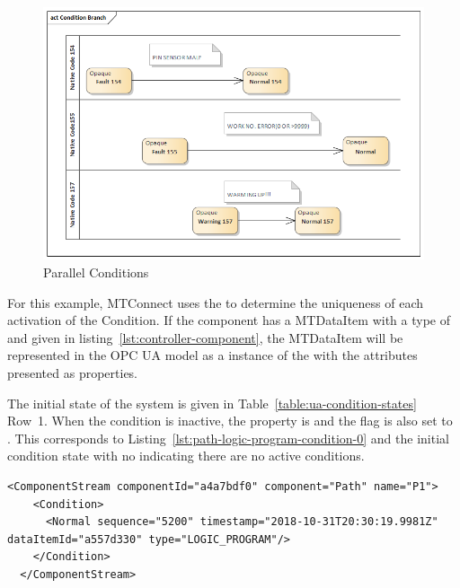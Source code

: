 \begin{figure}[ht]
  \centering
  \includegraphics[width=1.0\textwidth]{diagrams/mtconnect-mapping/condition-branching.png}
  \caption{Parallel Conditions}
  \label{fig:condition-branching}
\end{figure}

For this example, MTConnect uses the  to determine the uniqueness of each activation of the Condition. If the  component has a \gls{MTDataItem} with a \gls{type} of  and given in listing~\ref{lst:controller-component}, the \gls{MTDataItem} will be represented in the OPC UA model as a instance of the  with the attributes presented as properties.

The initial state of the system is given in Table~\ref{table:ua-condition-states} Row~1. When the condition is inactive, the  property is  and the  flag is also set to . This corresponds to Listing~\ref{lst:path-logic-program-condition-0} and the  initial condition state with no  indicating there are no active conditions.

\begin{lstlisting}[firstnumber=1,escapechar=|,%
    caption={Path Logic Program Initial Normal State},label={lst:path-logic-program-condition-0}]
  <ComponentStream componentId="a4a7bdf0" component="Path" name="P1">
    <Condition>
      <Normal sequence="5200" timestamp="2018-10-31T20:30:19.9981Z" dataItemId="a557d330" type="LOGIC_PROGRAM"/>
    </Condition>
  </ComponentStream>
\end{lstlisting}

